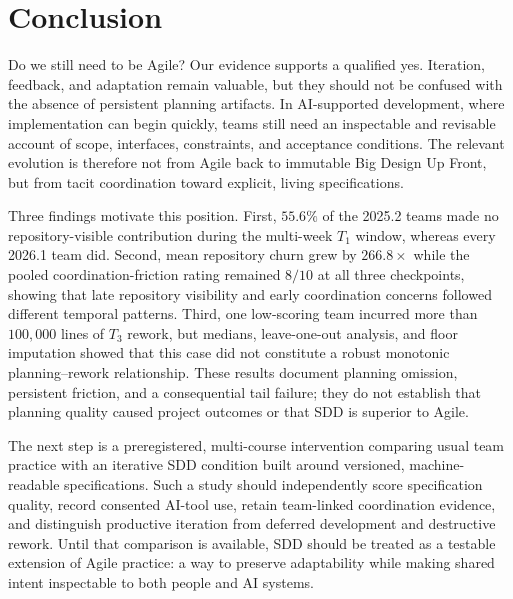 \documentclass[conference]{IEEEtran}
\begin{document}
\section{Conclusion}

Do we still need to be Agile? Our evidence supports a qualified yes. Iteration,
feedback, and adaptation remain valuable, but they should not be confused with
the absence of persistent planning artifacts. In AI-supported development,
where implementation can begin quickly, teams still need an inspectable and
revisable account of scope, interfaces, constraints, and acceptance conditions.
The relevant evolution is therefore not from Agile back to immutable Big Design
Up Front, but from tacit coordination toward explicit, living specifications.

Three findings motivate this position. First, $55.6\%$ of the 2025.2 teams
made no repository-visible contribution during the multi-week $T_1$ window,
whereas every 2026.1 team did. Second, mean repository churn grew by
$266.8\times$ while the pooled coordination-friction rating remained $8/10$
at all three checkpoints, showing that late repository visibility and early
coordination concerns followed different temporal patterns. Third, one
low-scoring team incurred more than $100{,}000$ lines of $T_3$ rework, but
medians, leave-one-out analysis, and floor imputation showed that this case did
not constitute a robust monotonic planning--rework relationship. These results
document planning omission, persistent friction, and a consequential tail
failure; they do not establish that planning quality caused project outcomes
or that SDD is superior to Agile.

The next step is a preregistered, multi-course intervention comparing usual
team practice with an iterative SDD condition built around versioned, machine-
readable specifications. Such a study should independently score specification
quality, record consented AI-tool use, retain team-linked coordination evidence,
and distinguish productive iteration from deferred development and destructive
rework. Until that comparison is available, SDD should be treated as a
testable extension of Agile practice: a way to preserve adaptability while
making shared intent inspectable to both people and AI systems.



\end{document}
